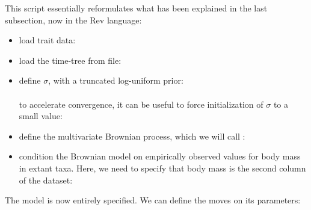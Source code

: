 This script essentially reformulates what has been explained in the last subsection, now in the Rev language:
\begin{itemize}
\item
load trait data:
\\
\item
load the time-tree from file:
\\
\item
define $\sigma$, with a truncated log-uniform prior:
\\
\\
to accelerate convergence, it can be useful to force initialization of $\sigma$ to a small value:
\\
\item
define the multivariate Brownian process, which we will call :
\\
\item
condition the Brownian model on empirically observed values for body mass in extant taxa.
Here, we need to specify that body mass is the second column of the dataset:
\\
\end{itemize}
The model is now entirely specified. We can define the moves on its parameters:
